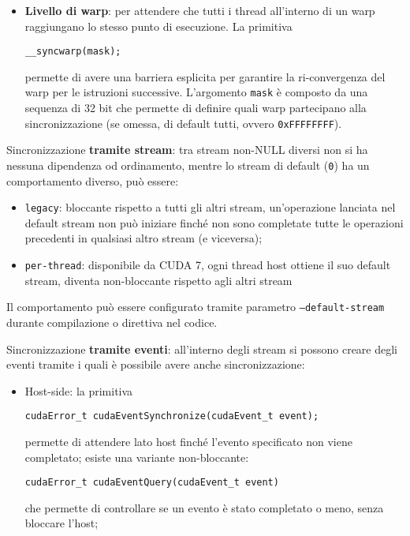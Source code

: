 \begin{questions}
\begin{solution}
\begin{itemize}
            \item \textbf{Livello di warp}: per attendere che tutti i thread all'interno di un warp raggiungano lo stesso punto di esecuzione. La primitiva
            \begin{verbatim}
__syncwarp(mask);
            \end{verbatim}
            permette di avere una barriera esplicita per garantire la ri-convergenza del warp per le istruzioni successive. L'argomento \texttt{mask} è composto da una sequenza di 32 bit che permette di definire quali warp partecipano alla sincronizzazione (se omessa, di default tutti, ovvero \texttt{0xFFFFFFFF}).
        \end{itemize}
        
        Sincronizzazione \textbf{tramite stream}: tra stream non-NULL diversi non si ha nessuna dipendenza od ordinamento, mentre lo stream di default (\texttt{0}) ha un comportamento diverso, può essere: 
        \begin{itemize}
            \item \texttt{legacy}: bloccante rispetto a tutti gli altri stream, un'operazione lanciata nel default stream non può iniziare finché non sono completate tutte le operazioni precedenti in qualsiasi altro stream (e viceversa);
            
            \item \texttt{per-thread}: disponibile da CUDA 7, ogni thread host ottiene il suo default stream, diventa non-bloccante rispetto agli altri stream
        \end{itemize}
        Il comportamento può essere configurato tramite parametro \texttt{--default-stream} durante compilazione o direttiva nel codice.
        
        Sincronizzazione \textbf{tramite eventi}: all'interno degli stream si possono creare degli eventi tramite i quali è possibile avere anche sincronizzazione:
        \begin{itemize}
            \item Host-side: la primitiva
            \begin{verbatim}
cudaError_t cudaEventSynchronize(cudaEvent_t event);
            \end{verbatim}
            permette di attendere lato host finché l'evento specificato non viene completato; esiste una variante non-bloccante:
            \begin{verbatim}
cudaError_t cudaEventQuery(cudaEvent_t event)
            \end{verbatim}
            che permette di controllare se un evento è stato completato o meno, senza bloccare l'host;
            

\end{itemize}
\end{solution}
\end{questions}
